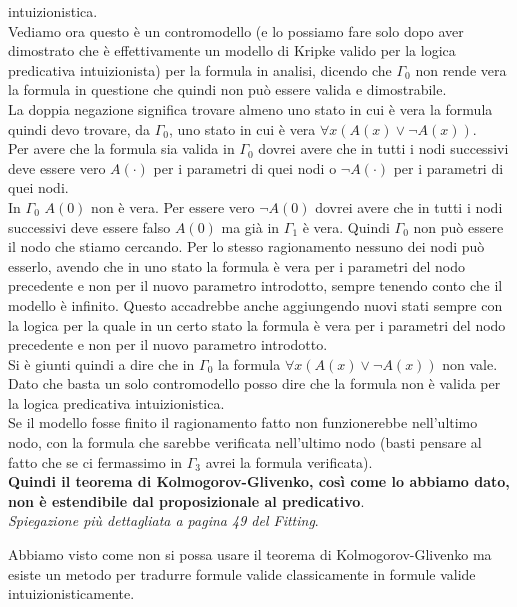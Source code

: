 \documentclass[a4paper,12pt, oneside]{book}
\begin{document}
\begin{esempio}
  intuizionistica. \\
  Vediamo ora questo è un contromodello (e lo possiamo fare solo dopo aver
  dimostrato che è effettivamente un modello di Kripke valido per la logica
  predicativa intuizionista) per la formula in analisi, dicendo che 
  $\Gamma_0$ non rende vera la formula in questione che quindi non può essere
  valida e dimostrabile.\\
  La doppia negazione significa trovare almeno uno stato in cui è vera la
  formula quindi devo trovare, da $\Gamma_0$, uno stato in cui è vera
  $\forall x(A(x)\lor \neg A(x))$. \\
  Per avere che la formula sia valida in $\Gamma_0$ dovrei avere che in tutti i
  nodi successivi deve essere vero $A(\cdot)$ per i parametri di quei nodi o
  $\neg A(\cdot)$ per i parametri di quei nodi. \\
  In $\Gamma_0$ $A(0)$ non è vera. Per essere vero $\neg A(0)$ dovrei
  avere che in tutti i nodi successivi deve essere falso $A(0)$ ma già in
  $\Gamma_1$ è vera. Quindi $\Gamma_0$ non può essere il nodo che stiamo
  cercando. Per lo stesso ragionamento nessuno dei nodi può esserlo, avendo che
  in uno stato la formula è vera 
  per i parametri del nodo precedente e non per il nuovo parametro
  introdotto, sempre tenendo conto che il modello è infinito. Questo accadrebbe
  anche aggiungendo nuovi stati sempre con la 
  logica per la quale in un certo stato la formula è vera 
  per i parametri del nodo precedente e non per il nuovo parametro
  introdotto.\\
  Si è giunti quindi a dire che in $\Gamma_0$ la formula $\forall x(A(x)\lor
  \neg A(x))$ non vale. Dato che basta un solo contromodello posso dire che la
  formula non è valida per la logica predicativa intuizionistica.\\
  Se il modello fosse finito il ragionamento fatto non funzionerebbe nell'ultimo
  nodo, con la formula che sarebbe verificata nell'ultimo nodo (basti pensare al
  fatto che se ci fermassimo in $\Gamma_3$ avrei la formula verificata). \\
  \textbf{Quindi il teorema di Kolmogorov-Glivenko, così come lo abbiamo dato,
    non è estendibile dal proposizionale al predicativo}.\\
  \textit{Spiegazione più dettagliata a pagina 49 del Fitting}.
\end{esempio}
Abbiamo visto come non si possa usare il teorema di Kolmogorov-Glivenko ma
esiste un metodo per tradurre formule valide classicamente in formule valide
intuizionisticamente.
\end{document}
